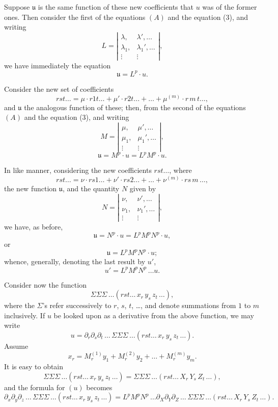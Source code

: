\documentclass[11pt,a4paper]{article}
\theoremstyle{plain}
\theoremstyle{definition}
\theoremstyle{remark}
\begin{document}
Suppose $\mathfrak{u}$ is the same function of these new coefficients that $u$ was of the former
ones. Then consider the first of the equations $(A)$ and the equation (3), and writing
\[
L = \left|
\begin{array}{cc}
\lambda,&\lambda',\ldots \\
\lambda_1,&\lambda_1',\ldots \\
\vdots&\vdots
\end{array}
\right|
\tag{10},
\]
we have immediately the equation
\[
\mathfrak{u} = L^p\cdot u \tag{11}.
\]

Consider the new set of coefficients
\[
rst\ldots = \mu\cdot r1t\ldots + \mu'\cdot r2t\ldots + \ldots + \mu^{(m)}\cdot r\,m\,t\ldots
\tag{12},
\]
and $\mathfrak{u}$ the analogous function of these; then, from the second of the equations $(A)$
and the equation (3), and writing
\[
M = \left|
\begin{array}{cc}
\mu,&\mu',\ldots \\
\mu_1,&\mu_1',\ldots \\
\vdots&\vdots
\end{array}
\right|
\tag{13},
\]
\[
\mathfrak{u} = M^p\cdot u = L^p M^p\cdot u
\tag{14}.
\]

\newpage

In like manner, considering the new coefficients $rst\ldots$, where
\[
rst\ldots = \nu\cdot rs1\ldots + \nu'\cdot rs2\ldots + \ldots + \nu^{(m)}\cdot rs\,m\,\ldots
\tag{15},
\]
the new function $\mathfrak{u}$, and the quantity $N$ given by
\[
N = \left|
\begin{array}{cc}
\nu,&\nu',\ldots \\
\nu_1,&\nu_1',\ldots \\
\vdots&\vdots
\end{array}
\right|
\tag{16},
\]
we have, as before,
\[
\mathfrak{u} = N^p\cdot u = L^p M^p N^p\cdot u
\tag{17},
\]
or
\[
\mathfrak{u} = L^p M^p N^p\cdot u
\tag{18};
\]
whence, generally, denoting the last result by $u'$,
\[
u' = L^p M^p N^p\,\ldots u
\tag{B, 1}.
\]

Consider now the function
\[
\Sigma\Sigma\Sigma\,\ldots(rst\ldots\,x_r\,y_s\,z_t\,\ldots)
\tag{19},
\]
where the $\Sigma$'s refer successively to $r$, $s$, $t$, \ldots, and denote summations from $1$ to $m$
inclusively. If $u$ be looked upon as a derivative from the above function, we may write
\[
u = \partial_{r}\partial_{s}\partial_{t}\,\ldots\,\Sigma\Sigma\Sigma\,\ldots(rst\ldots\,x_r\,y_s\,z_t\,\ldots)
\tag{20}.
\]
Assume
\[
x_r = M_r^{(1)} y_1 + M_r^{(2)} y_2 + \ldots + M_r^{(m)} y_m
\tag{21}.
\]
It is easy to obtain
\[
\Sigma\Sigma\Sigma\,\ldots(rst\ldots\,x_r\,y_s\,z_t\,\ldots) =
\Sigma\Sigma\Sigma\,\ldots(rst\ldots\,X_r\,Y_s\,Z_t\,\ldots)
\tag{22},
\]
and the formula for $(u)$ becomes
\[
\partial_{x}\partial_{y}\partial_{z}\,\ldots\,\Sigma\Sigma\Sigma\,\ldots(rst\ldots\,x_r\,y_s\,z_t\,\ldots)
= L^p M^p N^p\,\ldots
\partial_{X}\partial_{Y}\partial_{Z}\,\ldots\,\Sigma\Sigma\Sigma\,\ldots(rst\ldots\,X_r\,Y_s\,Z_t\,\ldots)
\tag{B, 2}.
\]
\end{document}
